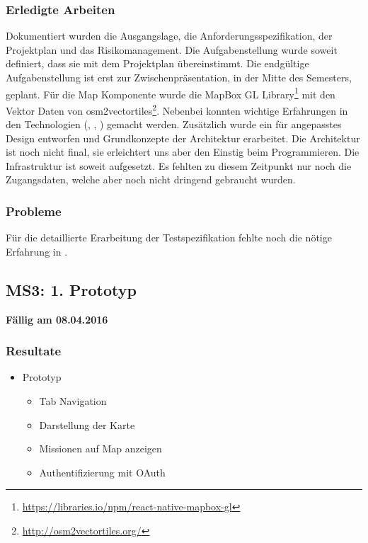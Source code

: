 \subsubsection{Erledigte Arbeiten}
Dokumentiert wurden die Ausgangslage, die Anforderungsspezifikation, der Projektplan und das Risikomanagement.
Die Aufgabenstellung wurde soweit definiert, dass sie mit dem Projektplan übereinstimmt.
Die endgültige Aufgabenstellung ist erst zur Zwischenpräsentation, in der Mitte des Semesters, geplant.
Für die Map Komponente wurde die MapBox GL Library\footnote{\url{https://libraries.io/npm/react-native-mapbox-gl}} mit den Vektor Daten von osm2vectortiles\footnote{\url{http://osm2vectortiles.org/}}.
Nebenbei konnten wichtige Erfahrungen in den Technologien (, , ) gemacht werden.
Zusätzlich wurde ein für  angepasstes Design entworfen und Grundkonzepte der Architektur erarbeitet.
Die Architektur ist noch nicht final, sie erleichtert uns aber den Einstig beim Programmieren.
Die Infrastruktur ist soweit aufgesetzt.
Es fehlten zu diesem Zeitpunkt nur noch die Zugangsdaten, welche aber noch nicht dringend gebraucht wurden.

\subsubsection{Probleme}
Für die detaillierte Erarbeitung der Testspezifikation fehlte noch die nötige Erfahrung in .


\subsection{MS3: 1. Prototyp}
\label{pm-ms3}
\textbf{Fällig am 08.04.2016}
\subsubsection{Resultate}
\begin{itemize}
	\item {} Prototyp
	\begin{itemize}
		\item Tab Navigation
		\item Darstellung der Karte
		\item Missionen auf Map anzeigen
		\item Authentifizierung mit OAuth
	\end{itemize}
\end{itemize}

